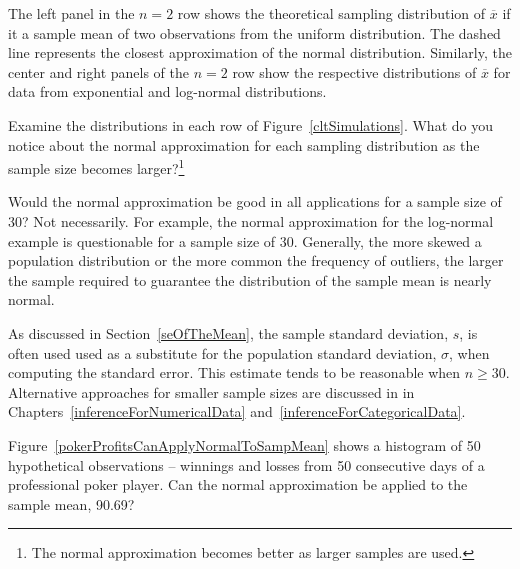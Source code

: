 \begin{spacing}{1.5}
The left panel in the $n=2$ row shows the theoretical sampling distribution of $\overline{x}$ if it a sample mean of two observations from the uniform distribution. The dashed line represents the closest approximation of the normal distribution. Similarly, the center and right panels of the $n=2$ row show the respective distributions of $\overline{x}$ for data from exponential and log-normal distributions.

\begin{exercise}
Examine the distributions in each row of Figure~\ref{cltSimulations}. What do you notice about the normal approximation for each sampling distribution as the sample size becomes larger?\footnote{The normal approximation becomes better as larger samples are used.}
\end{exercise}

\begin{example}{Would the normal approximation be good in all applications for a sample size of 30?}
Not necessarily. For example, the normal approximation for the log-normal example is questionable for a sample size of 30. Generally, the more skewed a population distribution or the more common the frequency of outliers, the larger the sample required to guarantee the distribution of the sample mean is nearly normal.
\end{example}

As discussed in Section~\ref{seOfTheMean}, the sample standard deviation, $s$, is often used  used as a substitute for the population standard deviation, $\sigma$, when computing the standard error. This estimate tends to be reasonable when $n\geq30$. Alternative approaches for smaller sample sizes are discussed in in Chapters~\ref{inferenceForNumericalData} and~\ref{inferenceForCategoricalData}.


\begin{example}{Figure~\ref{pokerProfitsCanApplyNormalToSampMean} shows a histogram of 50  hypothetical observations --  winnings and losses from 50 consecutive days of a professional poker player. Can the normal approximation be applied to the sample mean, 90.69?}


\end{example}
\end{spacing}
